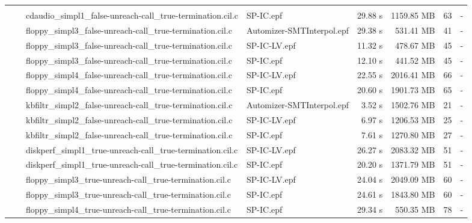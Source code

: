\documentclass[a4paper]{article}
\begin{document}
\begin{longtabu} to \linewidth {llllrrrr}
\toprule
  \header{}& 
  &
  & 
  & 
  &
  &
  &
  \\
  \cmidrule(r){2-8}
&  
 & cdaudio\_simpl1\_false-unreach-call\_true-termination.cil.c & SP-IC.epf & 29.88 s & 1159.85 MB & 63 & -\\
 &  & floppy\_simpl3\_false-unreach-call\_true-termination.cil.c & Automizer-SMTInterpol.epf & 29.38 s & 531.41 MB & 41 & -\\
 &  & floppy\_simpl3\_false-unreach-call\_true-termination.cil.c & SP-IC-LV.epf & 11.32 s & 478.67 MB & 45 & -\\
 &  & floppy\_simpl3\_false-unreach-call\_true-termination.cil.c & SP-IC.epf & 12.10 s & 441.52 MB & 45 & -\\
 &  & floppy\_simpl4\_false-unreach-call\_true-termination.cil.c & SP-IC-LV.epf & 22.55 s & 2016.41 MB & 66 & -\\
 &  & floppy\_simpl4\_false-unreach-call\_true-termination.cil.c & SP-IC.epf & 20.60 s & 1901.73 MB & 65 & -\\
 &  & kbfiltr\_simpl2\_false-unreach-call\_true-termination.cil.c & Automizer-SMTInterpol.epf & 3.52 s & 1502.76 MB & 21 & -\\
 &  & kbfiltr\_simpl2\_false-unreach-call\_true-termination.cil.c & SP-IC-LV.epf & 6.97 s & 1206.53 MB & 25 & -\\
 &  & kbfiltr\_simpl2\_false-unreach-call\_true-termination.cil.c & SP-IC.epf & 7.61 s & 1270.80 MB & 27 & -\\
  \cmidrule[0.01em](l){2-8}
&  
 & diskperf\_simpl1\_true-unreach-call\_true-termination.cil.c & SP-IC-LV.epf & 26.27 s & 2083.32 MB & 51 & -\\
 &  & diskperf\_simpl1\_true-unreach-call\_true-termination.cil.c & SP-IC.epf & 20.20 s & 1371.79 MB & 51 & -\\
 &  & floppy\_simpl3\_true-unreach-call\_true-termination.cil.c & SP-IC-LV.epf & 24.04 s & 2049.09 MB & 60 & -\\
 &  & floppy\_simpl3\_true-unreach-call\_true-termination.cil.c & SP-IC.epf & 24.61 s & 1843.80 MB & 60 & -\\
 &  & floppy\_simpl4\_true-unreach-call\_true-termination.cil.c & SP-IC.epf & 29.34 s & 550.35 MB & 78 & -\\

\end{longtabu}
\end{document}
